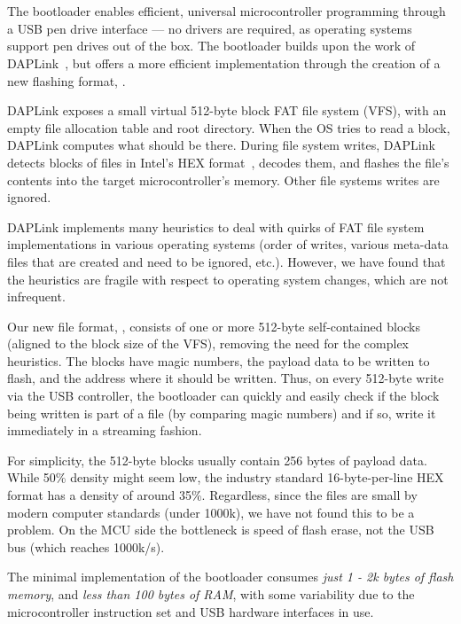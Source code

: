 \section{\UF}
\label{sec:uf2}

The \UF bootloader enables efficient, universal microcontroller programming through a USB pen drive interface --- no drivers are required, as operating systems support pen drives out of the box. The \UF bootloader builds upon the work of DAPLink~\cite{GitHubAR5:online}, but offers a more efficient implementation through the creation of a new flashing format, \UFN.

DAPLink exposes a small virtual 512-byte block FAT file system (VFS), with an empty file allocation table and root directory. When the OS tries to read a block, DAPLink computes what should be there. During file system writes, DAPLink detects blocks of files in Intel's HEX format~\cite{IntelHEX}, decodes them, and flashes the file's contents into the target microcontroller's memory. Other file systems writes are ignored.

DAPLink implements many heuristics to deal with quirks of FAT file
system implementations in various operating systems (order of writes, various meta-data files that are created and need to be ignored, etc.).  However, we have found that the heuristics are fragile with respect to operating system changes, which are not infrequent.

Our new file format, \UFN, consists of one or more 512-byte self-contained blocks (aligned to the block size of the VFS), removing the need for the complex heuristics. The blocks have magic numbers, the payload data to be written to flash, and the address where it should be written. Thus, on every 512-byte write via the USB controller, the bootloader can quickly and easily check if the block being written is part of a \UF file (by comparing magic numbers) and if so, write it immediately in a streaming fashion.

For simplicity, the 512-byte \UF blocks usually contain 256 bytes of payload data. While 50\% density might seem low, the industry standard 16-byte-per-line HEX format has a density of around 35\%. Regardless, since the files are small by modern computer standards (under 1000k), we have not found this to be a problem. On the MCU side the bottleneck is speed of flash erase, not the USB bus (which reaches 1000k/s).

The minimal implementation of the \UF bootloader consumes \emph{just 1 - 2k bytes of flash memory}, and \emph{less than 100 bytes of RAM}, with some variability due to the microcontroller instruction set and USB hardware interfaces in use.

